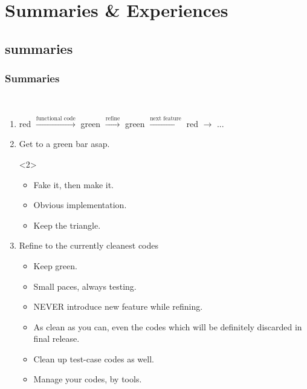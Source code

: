 \documentclass[lualatex]{beamer}
\begin{document}
\section{Summaries \& Experiences}

\subsection{summaries}

\begin{frame}[t]
  \frametitle{Summaries}

  \begin{block}{~}
    \begin{enumerate}
    \item 
      red $\xrightarrow{\text{functional code}}$ green $\xrightarrow{\text{refine}}$ green $\xrightarrow{\text{next feature}}$ red $\rightarrow$ ...
    \item<2->
      Get to a green bar asap.
      \begin{onlyenv}<2>
        \begin{itemize}
        \item
          Fake it, then make it.
        \item 
          Obvious implementation.
        \item 
          Keep the triangle.
        \end{itemize}
      \end{onlyenv}
    \item<3>
      Refine to the currently cleanest codes
      \begin{itemize}
      \item
        Keep green.
      \item 
        Small paces, always testing.
      \item
        NEVER introduce new feature while refining.
      \item 
        As clean as you can, even the codes which will be definitely discarded in final release.
      \item 
        Clean up test-case codes as well.
      \item 
        Manage your codes, by tools.
      \end{itemize}
    \end{enumerate}
  \end{block}
\end{frame}
\end{document}
